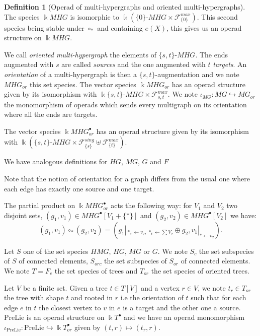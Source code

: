 \documentclass[a4paper]{article}
\theoremstyle{definition}
\newtheorem{definition}{Definition}
\begin{document}
\begin{definition}[Operad of multi-hypergraphs and oriented multi-hypergraphs]
The species $\Bbbk MHG$ is isomorphic to $\Bbbk (\{0\}\text{-}MHG\times\mathcal{F}_{\{0\}}^{max})$. This second species being stable under $\circ_{\ast}$ and containing $e(X)$, this gives us an operad structure on $\Bbbk MHG$.

We call \textit{oriented multi-hypergraph} the elements of $\{s,t\}\text{-}MHG$. The ends augmented with $s$ are called \textit{sources} and the one augmented with $t$ \textit{targets}. An \textit{orientation} of a multi-hypergraph is then a $\{s,t\}$-augmentation and we note $MHG_{or}$ this set species.
The vector species $\Bbbk MHG_{or}$ has an operad structure given by its isomorphism with $\Bbbk \{s,t\}\text{-}MHG\times\mathcal{F}_{s,t}^{max}$. We note $\iota_{MG}: MG \hookrightarrow MG_{or}$ the monomorphism of operads which sends every multigraph on its orientation where all the ends are targets.

The vector species $\Bbbk MHG_{or}^{\bullet}$ has an operad structure given by its isomorphism with $\Bbbk (\{s,t\}\text{-}MHG\times\mathcal{F}_{\{s\}}^{sing}\uplus\mathcal{F}_{\{t\}}^{max})$.

We have analogous definitions for $HG$, $MG$, $G$ and $F$ 
\end{definition}
Note that the notion of orientation for a graph differs from the usual one where each edge has exactly one source and one target.

The partial product on $\Bbbk MHG_{or}^{\bullet}$ acts the following way: for $V_1$ and $V_2$ two disjoint sets, $(g_1,v_1)\in MHG^{\bullet}[V_1+\{\ast\}]$ and $(g_2,v_2)\in MHG^{\bullet}[V_2]$ we have:
$$ (g_1,v_1)\circ_{\ast} (g_2,v_2) = (g_1|_{\ast_s \leftarrow v_2,\, \ast_t \leftarrow\sum V_2}\oplus g_2, v_1|_{\ast \leftarrow v_2}).$$

\vspace{1cm}

Let $S$ one of the set species $HMG$, $HG$, $MG$ or $G$. We note $S_c$ the set subspecies of $S$ of connected elements, $S_{orc}$ the set subspecies of $S_{or}$ of connected elements. We note $T=F_c$ the set species of trees and $T_{or}$ the set species of oriented trees.

Let $V$ be a finite set. Given a tree $t\in T[V]$ and a vertex $r\in V$, we note $t_r\in T_{or}$ the tree with shape $t$ and rooted in $r$ i.e the orientation of $t$ such that for each edge $e$ in $t$ the closest vertex to $v$ in $e$ is a target and the other one a source. $\text{PreLie}$ is an operad structure on $\Bbbk T^{\bullet}$ and we have an operad monomorphism $\iota_{\text{PreLie}}:\text{PreLie} \hookrightarrow \Bbbk T_{or}^{\bullet}$ given by $(t,r)\mapsto (t_r,r)$.
\end{document}
